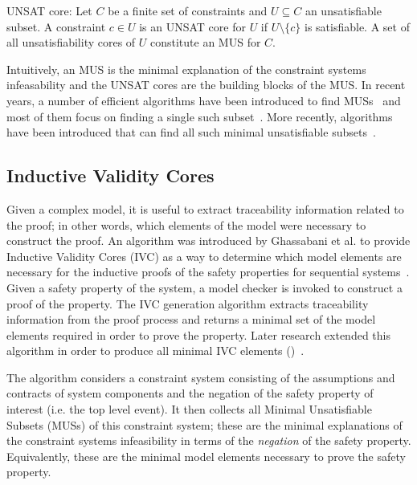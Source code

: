 \begin{definition} UNSAT core: Let $C$ be a finite set of constraints and $U \subseteq C$ an unsatisfiable subset. A constraint $c \in U$ is an UNSAT core for $U$ if $U \setminus \{c\}$ is satisfiable. A set of all unsatisfiability cores of $U$ constitute an MUS for $C$. 
\end{definition}

Intuitively, an MUS is the minimal explanation of the constraint systems infeasability and the UNSAT cores are the building blocks of the MUS. In recent years, a number of efficient algorithms have been introduced to find MUSs~\cite{liffiton2005max} and most of them focus on finding a single such subset~\cite{belov2012towards, belov2013core, belov2012muser2}. More recently, algorithms have been introduced that can find all such minimal unsatisfiable subsets~\cite{GhassabaniGW16, Ghassabani2017EfficientGO,bendik2018online}. 

\subsection{Inductive Validity Cores} Given a complex model, it is useful to extract traceability information related to the proof; in other words, which elements of the model were necessary to construct the proof. An algorithm was introduced by Ghassabani et al. to provide Inductive Validity Cores (IVC) as a way to determine which model elements are necessary for the inductive proofs of the safety properties for sequential systems~\cite{GhassabaniGW16}. Given a safety property of the system, a model checker is invoked to construct a proof of the property. The IVC generation algorithm extracts traceability information from the proof process and returns a minimal set of the model elements required in order to prove the property. Later research extended this algorithm in order to produce all minimal IVC elements (\aivcalg)~\cite{Ghassabani2017EfficientGO,bendik2018online}. 

The \aivcalg algorithm considers a constraint system consisting of the assumptions and contracts of system components and the negation of the safety property of interest (i.e. the top level event). It then collects all Minimal Unsatisfiable Subsets (MUSs) of this constraint system; these are the minimal explanations of the constraint systems infeasibility in terms of the \textit{negation} of the safety property. Equivalently, these are the minimal model elements necessary to prove the safety property. 

 











